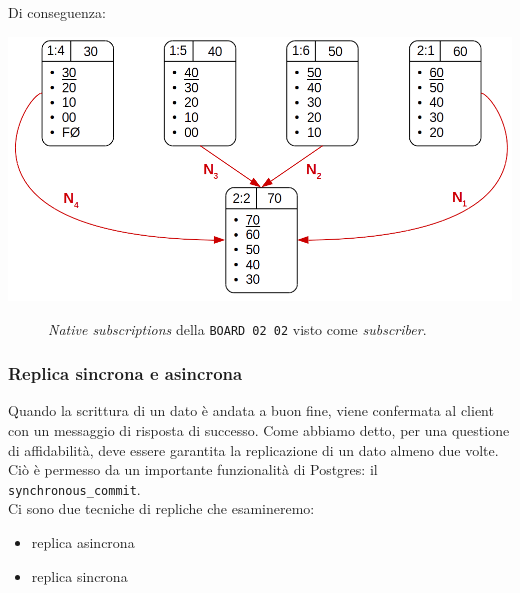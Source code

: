 Di conseguenza:

\begin{center}
\includegraphics[scale=0.50]{img/sub_native.png}
\end{center}
\begin{figure}[htbp]
\caption{\textit{Native subscriptions} della \verb"BOARD 02 02" visto come \textit{subscriber}. \label{figura1.17}}
\end{figure}

\subsubsection{Replica sincrona e asincrona}
Quando la scrittura di un dato \`{e} andata a buon fine, viene confermata al client con un messaggio di risposta di successo. Come abbiamo detto, per una questione di affidabilit\`{a}, deve essere garantita la replicazione di un dato almeno due volte. Ci\`{o} \`{e} permesso da un importante funzionalit\`{a} di Postgres: il \verb"synchronous_commit".\\
Ci sono due tecniche di repliche che esamineremo: 
\begin{itemize}
\item 
replica asincrona 
\item
replica sincrona
\end{itemize}

